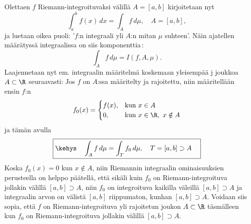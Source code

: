 Olettaen $f$ Riemann-integroituvaksi välillä $A=[a,b]$ kirjoitetaan nyt
\[
\int_a^b f(x)\, dx=\int_A f\, d\mu, \quad A=[a,b],
\]
ja luetaan oikea puoli: '$f$:n integraali yli $A$:n mitan $\mu$ suhteen'. Näin ajatellen 
määrätyssä integraalissa on siis  komponenttia\,:
\[
\int_A f\, d\mu=I(f,A,\mu).
\]
Laajennetaan nyt em. integraalin määritelmä koskemaan yleisempää j 
joukkoa $A\subset\R$ seuraavasti: Jos $f$ on $A$:ssa määritelty ja rajoitettu, niin määritellään
ensin $f$:n 
\[
f_0(x)=\begin{cases} 
       f(x), &\text{kun}\ x\in A \\ 0, &\text{kun}\ x\in\R,\ x\notin A 
       \end{cases}
\]
ja tämän avulla
\[
\boxed{\kehys\quad \int_A f \, d\mu=\int_T f_0 \, d\mu,\quad T=[a,b]\supset A \quad}
\]
Koska $f_0(x)=0$ kun $x\not\in A$, niin Riemannin integraalin ominaisuuksien perusteella on 
helppo päätellä, että sikäli kuin $f_0$ on Riemann-integroituva jollakin välillä 
$[a,b]\supset A$, niin $f_0$ on integroituva kaikilla väleillä $[a,b]\supset A$ ja integraalin
arvon on välistä $[a,b]$ riippumaton, kunhan $[a,b]\supset A$. Voidaan siis sopia, että $f$ on
Riemann-integroituva yli rajoitetun joukon $A\subset\R$ täsmälleen kun $f_0$ on
Riemann-integroituva jollakin välillä $[a,b]\supset A$.

